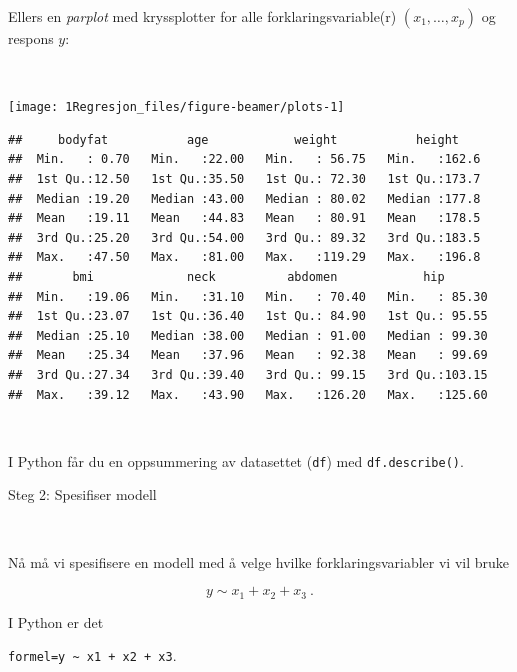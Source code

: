\documentclass[10pt,ignorenonframetext,]{beamer}
\begin{document}
\begin{frame}

Ellers en \emph{parplot} med kryssplotter for alle
forklaringsvariable(r) \((x_1,\ldots, x_p)\) og respons \(y\):

\(~\)

\begin{center}\texttt{[image: 1Regresjon\_files/figure-beamer/plots-1]} \end{center}

\end{frame}

\begin{frame}[fragile]

\scriptsize

\begin{verbatim}
##     bodyfat           age            weight           height     
##  Min.   : 0.70   Min.   :22.00   Min.   : 56.75   Min.   :162.6  
##  1st Qu.:12.50   1st Qu.:35.50   1st Qu.: 72.30   1st Qu.:173.7  
##  Median :19.20   Median :43.00   Median : 80.02   Median :177.8  
##  Mean   :19.11   Mean   :44.83   Mean   : 80.91   Mean   :178.5  
##  3rd Qu.:25.20   3rd Qu.:54.00   3rd Qu.: 89.32   3rd Qu.:183.5  
##  Max.   :47.50   Max.   :81.00   Max.   :119.29   Max.   :196.8  
##       bmi             neck          abdomen            hip        
##  Min.   :19.06   Min.   :31.10   Min.   : 70.40   Min.   : 85.30  
##  1st Qu.:23.07   1st Qu.:36.40   1st Qu.: 84.90   1st Qu.: 95.55  
##  Median :25.10   Median :38.00   Median : 91.00   Median : 99.30  
##  Mean   :25.34   Mean   :37.96   Mean   : 92.38   Mean   : 99.69  
##  3rd Qu.:27.34   3rd Qu.:39.40   3rd Qu.: 99.15   3rd Qu.:103.15  
##  Max.   :39.12   Max.   :43.90   Max.   :126.20   Max.   :125.60
\end{verbatim}

\(~\)

\normalsize

I Python får du en oppsummering av datasettet (\texttt{df}) med
\texttt{df.describe()}.

\end{frame}

\begin{frame}[fragile]

\begin{block}{Steg 2: Spesifiser modell}

\(~\)

Nå må vi spesifisere en modell med å velge hvilke forklaringsvariabler
vi vil bruke

\[ y \sim x_1 + x_2 + x_3 \ .\]

\vspace{2mm}

I Python er det

\vspace{2mm}

\centering

\texttt{formel=\textquotesingle{}y\ \textasciitilde{}\ x1\ +\ x2\ +\ x3\textquotesingle{}}.

\end{block}

\end{frame}
\end{document}
